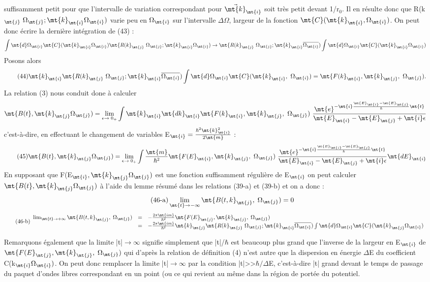 {{{suffisamment petit pour que l'intervalle de variation correspondant pour
$\vec{\mt{k}}_\mt{i}$ soit très petit devant 1/r$_0$. Il en résulte donc que R(k$_\mt{j}\ \Omega_\mt{j };\mt{ k}_\mt{i }\Omega_\mt{i})$
varie peu en $\Omega_\mt{i}$ sur l'intervalle $\Delta\Omega$, largeur de la fonction $\mt{C}(\mt{k}_\mt{i},\Omega_\mt{i})$. On
peut donc écrire la dernière intégration de (43) :
\[
\int\mt{d}\Omega_\mt{i}\mt{ C}(\mt{k}_\mt{i }\Omega_\mt{i})
\mt{ R(k}_\mt{j}\ \Omega_\mt{j };\mt{ k}_\mt{i }\Omega_\mt{i})\to
\mt{ R(k}_\mt{j}\ \Omega_\mt{j };\mt{ k}_\mt{i }\overline{\Omega_\mt{i}})
\int\mt{d}\Omega_\mt{i}\mt{ C}(\mt{k}_\mt{i }\Omega_\mt{i})
\]
Posons alors
\[
\tag{44}\mt{k}_\mt{i }\mt{ R(k}_\mt{j}\ \Omega_\mt{j };\mt{ k}_\mt{i }\overline{\Omega_\mt{i}})
\int\mt{d}\Omega_\mt{i}\mt{ C}(\mt{k}_\mt{i},\ \Omega_\mt{i})=\mt{ F(k}_\mt{i},\mt{ k}_\mt{j},\ \Omega_\mt{j}).
\]
La relation (3) nous conduit done à calculer
\[
\mt{ B(t},\mt{ k}_\mt{j }\Omega_\mt{j})=\lim_{\epsilon\to\;0_+}
\int\mt{k}_\mt{i}\mt{ dk}_\mt{i }\mt{ F(k}_\mt{i},\mt{ k}_\mt{j},\ \Omega_\mt{j})
\ \frac{\mt{e}^{-\mt{i}\frac{\mt{E}_\mt{i}-\mt{E}_\mt{j}}{\hbar}\mt{t}}}{\mt{E}_\mt{i}-\mt{E}_\mt{j}+\mt{i}\epsilon}
\]
c'est-à-dire, en effectuant le changement de variables E$_\mt{i}=\frac{\hbar^2\mt{k}_\mt{i}^2}{2\mt{m}}$ :
\[
\tag{45}\mt{ B(t},\mt{ k}_\mt{j }\Omega_\mt{j})=\lim_{\epsilon\to\;0_+}
\int\frac{\mt{m}}{\hbar^2}\mt{ F(E}_\mt{i},\mt{ k}_\mt{j},\ \Omega_\mt{j})
\ \frac{\mt{e}^{-\mt{i}\frac{\mt{E}_\mt{i}-\mt{E}_\mt{j}}{\hbar}\mt{t}}}{\mt{E}_\mt{i}-\mt{E}_\mt{j}+\mt{i}\epsilon}
\mt{ dE}_\mt{i }
\]
En supposant que F(E$_\mt{i},\mt{ k}_\mt{j }\Omega_\mt{j})$ est une fonction suffisamment régulière
de E$_\mt{i}$ on peut calculer $\mt{ B(t},\mt{ k}_\mt{j }\Omega_\mt{j})$ à l'aide du lemme résumé dans les
relations (39-a) et (39-b) et on a donc :
\[
\tag{46-a}\lim_{\mt{t}\to-\infty}\mt{ B(t, k}_\mt{j},\;\Omega_\mt{j})=0
\]
\[
\tag{46-b}\begin{array}{rcl}
\lim_{\mt{t}\to+\infty}\mt{ B(t, k}_\mt{j},\;\Omega_\mt{j}) & = & -\frac{2\pi\mt{i m}}{\hbar^2}\mt{ F(E}_\mt{j},\mt{ k}_\mt{j},\;\Omega_\mt{j})\\
 & = & -\frac{2\pi\mt{i m}}{\hbar^2}\mt{ k}_\mt{j}\mt{ R(k}_\mt{j}\ \Omega_\mt{j };\mt{ k}_\mt{i }\overline{\Omega_\mt{i}})
\int\mt{d}\Omega_\mt{i}\mt{ C}(\mt{k}_\mt{j }\Omega_\mt{i}) \end{array}
\]

Remarquons également que la limite |t|$\to\infty$ signifie simplement que |t|/$\hbar$
est beaucoup plus grand que l'inverse de la largeur en E$_\mt{i}$ de $\mt{ F(E}_\mt{j},\mt{ k}_\mt{j},\;\Omega_\mt{j})$
qui d'après la relation de définition (4) n'est autre que la dispersion en
énergie $\Delta$E du coefficient C(k$_\mt{i }\Omega_\mt{i})$. On peut donc remplacer la limite
|t|$\to\infty$ par la condition |t|>>$\hbar/\Delta$E, c'est-à-dire |t| grand devant
le temps de passage du paquet d'ondes libres correspondant en un point (ou
ce qui revient au même dans la région de portée du potentiel.

}}}
